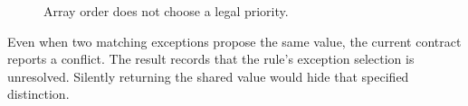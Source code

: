 \begin{figure}[H]
\centering
{}
\caption{Array order does not choose a legal priority.}\label{fig:teach-P-03a-rule-contract-02}
\end{figure}

Even when two matching exceptions propose the same value, the current contract reports a conflict. The result records that the rule's exception selection is unresolved. Silently returning the shared value would hide that specified distinction.


